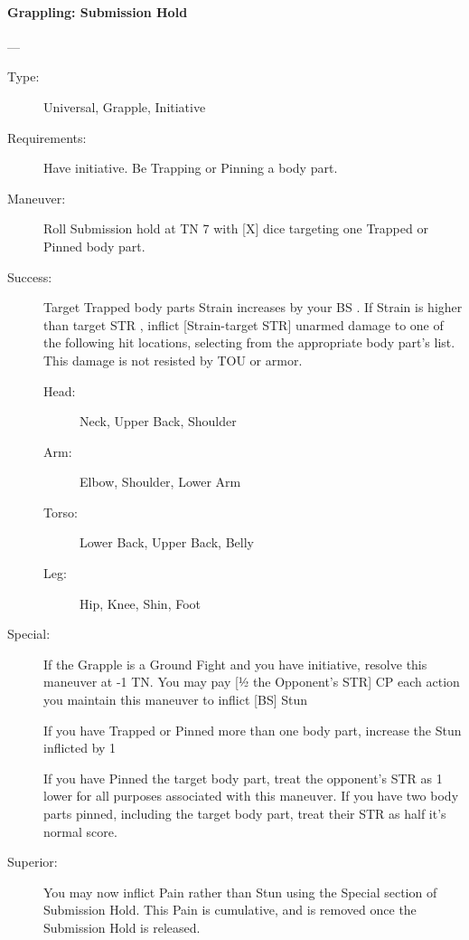 \paragraph{Grappling: Submission Hold \large} \label{man:grappling-submission-hold}
---\quad {\large [X+1]}
\vspace{-10pt} \begin{description}
\item [Type:] Universal, Grapple, Initiative
\item [Requirements:] Have initiative. Be Trapping or Pinning a body part.
\item [Maneuver:] Roll Submission hold at TN 7 with [X] dice targeting one Trapped or Pinned body
part.

\item [Success:] Target Trapped body parts Strain increases by your BS . If
Strain is higher than target STR , inflict [Strain-target STR] unarmed damage
to one of the following hit locations, selecting from the appropriate body
part’s list. This damage is not resisted by TOU or armor. 
  \begin{description}
  \item [Head: ] Neck, Upper Back, Shoulder
  \item [Arm: ] Elbow, Shoulder, Lower Arm
  \item [Torso: ] Lower Back, Upper Back, Belly
  \item [Leg: ] Hip, Knee, Shin, Foot
  \end{description}
\item [Special:] If the Grapple is a Ground Fight and you have initiative,
  resolve this maneuver at -1 TN. You may pay [1⁄2 the Opponent’s STR] CP each
  action you maintain this maneuver to inflict [BS] Stun  

If you have Trapped or Pinned more than one body part, increase the Stun
inflicted by 1 

If you have Pinned the target body part, treat the opponent’s STR as 1 lower for
all purposes associated with this maneuver. If you have two body parts pinned,
including the target body part, treat their STR as half it’s normal score. 

\item [ Superior: ]
 You may now inflict Pain rather than Stun using the Special section of
 Submission Hold. This Pain is cumulative, and is removed once the Submission
 Hold is released.  
\end{description}

